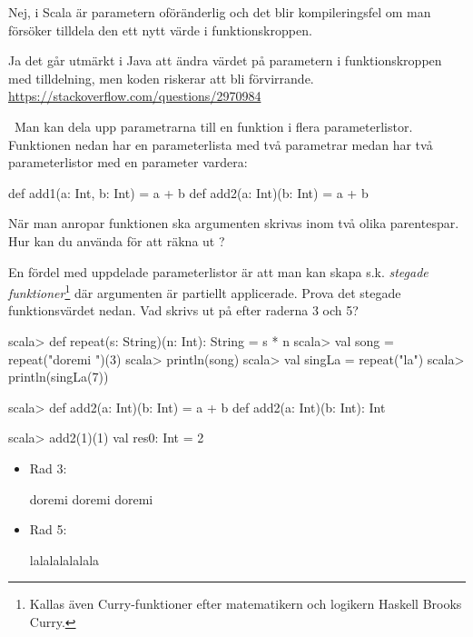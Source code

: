 \Subtask Nej, i Scala är parametern oföränderlig och det blir kompileringsfel om man försöker tilldela den ett nytt värde i funktionskroppen.

\Subtask Ja det går utmärkt i Java att ändra värdet på parametern i funktionskroppen med tilldelning, men koden riskerar att bli förvirrande.\\
\url{https://stackoverflow.com/questions/2970984}

\QUESTEND





\QUESTBEGIN

\Task \what~Man kan dela upp parametrarna till en funktion i flera parameterlistor. Funktionen  nedan har en parameterlista med två parametrar medan  har två parameterlistor med en parameter vardera:
\begin{Code}
  def add1(a: Int, b: Int) = a + b
  def add2(a: Int)(b: Int) = a + b
\end{Code}

\Subtask  När man anropar funktionen  ska argumenten skrivas inom två olika parentespar. Hur kan du använda  för att räkna ut ?

\Subtask En fördel med uppdelade parameterlistor är att man kan skapa s.k. \emph{stegade funktioner}\footnote{Kallas även Curry-funktioner efter matematikern och logikern Haskell Brooks Curry.} där argumenten är partiellt applicerade. Prova det stegade funktionsvärdet  nedan. Vad skrivs ut på efter raderna 3 och 5?

\begin{REPL}
scala> def repeat(s: String)(n: Int): String = s * n
scala> val song = repeat("doremi ")(3)
scala> println(song)
scala> val singLa = repeat("la")
scala> println(singLa(7))
\end{REPL}

\SOLUTION

\TaskSolved \what

\SubtaskSolved
\begin{REPL}
scala> def add2(a: Int)(b: Int) = a + b
def add2(a: Int)(b: Int): Int

scala> add2(1)(1)
val res0: Int = 2
\end{REPL}

\SubtaskSolved
\begin{itemize}

\item Rad 3:
\begin{REPLnonum}
doremi doremi doremi 
\end{REPLnonum}

\item Rad 5:
\begin{REPLnonum}
lalalalalalala
\end{REPLnonum}

\end{itemize}


